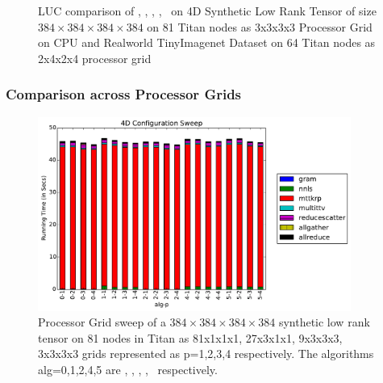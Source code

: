 \begin{figure}
\caption{LUC comparison of \MU, \HALS, \BPP, \ADMM, \Nestrov\ on 4D Synthetic Low Rank Tensor of size $384 \times 384 \times 384 \times 384$ on 81 Titan nodes as 3x3x3x3 Processor Grid on CPU and Realworld TinyImagenet Dataset on 64 Titan nodes as 2x4x2x4 processor grid}
\label{fig:luccomp}
\end{figure}

\subsubsection{Comparison across Processor Grids}

\begin{figure}
\includegraphics[width=\textwidth, height=2.5in]{data/plots/confsweep4d.pdf}
\caption{Processor Grid sweep of a $384 \times 384 \times 384 \times 384$ synthetic low rank tensor on 81 nodes in Titan as 81x1x1x1, 27x3x1x1, 9x3x3x3, 3x3x3x3 grids represented as p=1,2,3,4 respectively. The algorithms alg=0,1,2,4,5 are \MU, \HALS, \BPP, \ADMM, \Nestrov\ respectively.}
\label{fig:confsweep4D}
\end{figure}

